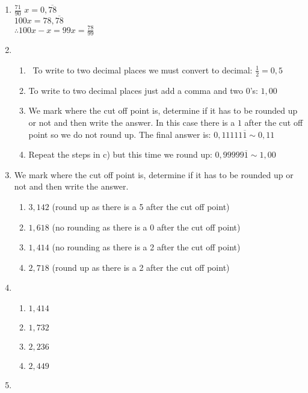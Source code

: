 \begin{solutions}{}
{\begin{enumerate}[itemsep=5pt, label=\textbf{\arabic*}. ]

\item $\frac{71}{90}$%
$x=0,\overline{78}$\\
$100x=78,\overline{78}$\\ 
$\therefore 100x-x=99x=\frac{78}{99}$
\item %
    \begin{enumerate}[noitemsep, label=\textbf{(\alph*)} ]  
    \item  To write to two decimal places we must convert to decimal: $\frac{1}{2}=0,5$%
    \item To write to two decimal places just add a comma and two $0$'s: $1,00$%
    \item We mark where the cut off point is, determine if it has to be rounded up or not and then write the answer. In this case there is a $1$ 
after the cut off point so we do not round up. The final answer is: $0,11111\overline{1} \sim 0,11$%
    \item Repeat the steps in c) but this time we round up: $0,99999\overline{1} \sim 1,00$%
    \end{enumerate}

\item %
We mark where the cut off point is, determine if it has to be rounded up or not and then write the answer. 
    \begin{enumerate}[noitemsep, label=\textbf{(\alph*)} ] 
\item $3,142$ (round up as there is a 5 after the cut off point) 
\item $1,618$ (no rounding as there is a 0 after the cut off point) 
\item $1,414$ (no rounding as there is a 2 after the cut off point) 
\item $2,718$ (round up as there is a 2 after the cut off point) 
    \end{enumerate}

\item %
% 
    \begin{enumerate}[noitemsep, label=\textbf{(\alph*)} ] 
    \item $1,414$ %
    \item $1,732$%
    \item $2,236$%
    \item $2,449$%
    \end{enumerate}
% 
% 
\item %


\end{enumerate}}
\end{solutions}
